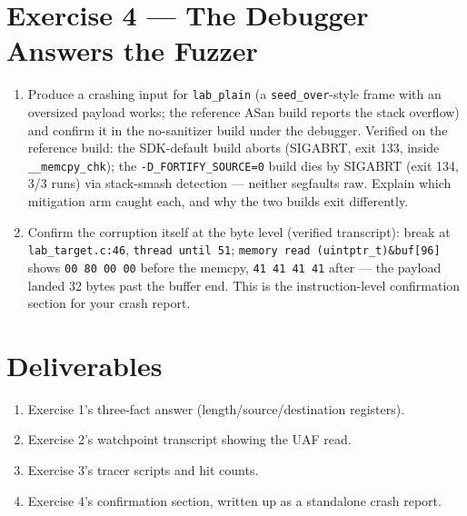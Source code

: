 \documentclass[12pt]{Training}
\begin{document}
\section*{Exercise 4 --- The Debugger Answers the Fuzzer}
\begin{enumerate}
    \item Produce a crashing input for \lstinline{lab_plain} (a \lstinline{seed_over}-style frame with an oversized payload works; the reference ASan build reports the stack overflow) and confirm it in the no-sanitizer build under the debugger. Verified on the reference build: the SDK-default build aborts (SIGABRT, exit 133, inside \lstinline{__memcpy_chk}); the \lstinline{-D_FORTIFY_SOURCE=0} build dies by SIGABRT (exit 134, 3/3 runs) via stack-smash detection --- neither segfaults raw. Explain which mitigation arm caught each, and why the two builds exit differently.
    \item Confirm the corruption itself at the byte level (verified transcript): break at \lstinline{lab_target.c:46}, \lstinline{thread until 51}; \lstinline{memory read (uintptr_t)&buf[96]} shows \lstinline{00 80 00 00} before the memcpy, \lstinline{41 41 41 41} after --- the payload landed 32 bytes past the buffer end. This is the instruction-level confirmation section for your crash report.
\end{enumerate}

\section*{Deliverables}
\begin{enumerate}
    \item Exercise 1's three-fact answer (length/source/destination registers).
    \item Exercise 2's watchpoint transcript showing the UAF read.
    \item Exercise 3's tracer scripts and hit counts.
    \item Exercise 4's confirmation section, written up as a standalone crash report.
\end{enumerate}
\end{document}
